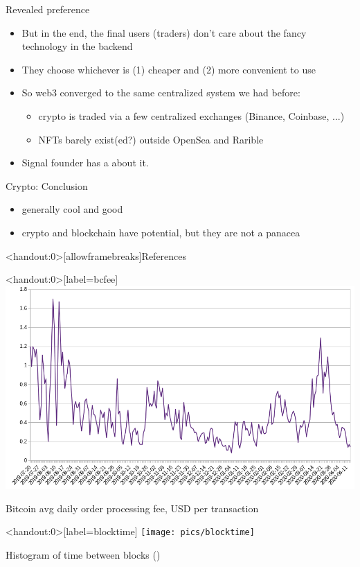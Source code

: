 \documentclass[english,10pt
,aspectratio=169
]{beamer}
\begin{document}
\begin{frame}{Revealed preference}
	\begin{itemize}
		\item But in the end, the final users (traders) don't care about the fancy technology in the backend
		\item They choose whichever is (1) cheaper and (2) more convenient to use
		\item So web3 converged to the same centralized system we had before:
		\begin{itemize}
			\item crypto is traded via a few centralized exchanges (Binance, Coinbase, ...)
			\item NFTs barely exist(ed?) outside OpenSea and Rarible
		\end{itemize}
		\item Signal founder has a \href{https://moxie.org/2022/01/07/web3-first-impressions.html}{} about it.
	\end{itemize}
\end{frame}


\begin{frame}{Crypto: Conclusion}
	\begin{itemize}
		\item generally cool and good
		\item crypto and blockchain have potential, but they are not a panacea
	\end{itemize}
\end{frame}



\appendix
\begin{frame}<handout:0>[allowframebreaks]{References}
	
	
\end{frame}


\begin{frame}<handout:0>[label=bcfee]
	\centering
	\includegraphics[width=0.8\paperwidth]{pics/bitcoin_orderfee}
	
	Bitcoin avg daily order processing fee, USD per transaction \hyperlink{problems}{}
\end{frame}


\begin{frame}<handout:0>[label=blocktime]
	\centering
	\texttt{[image: pics/blocktime]}
	
	Histogram of time between blocks (\cite{lehar_miner_2020}) \hyperlink{problems}{}
\end{frame}
\end{document}
